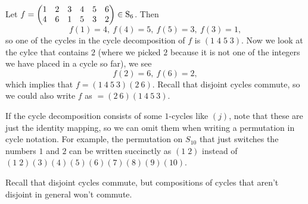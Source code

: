 \documentclass[11pt,dvipsnames]{book}
\numberwithin{figure}{section} %
\numberwithin{table}{section} %
\begin{document}
 \begin{example}  Let
$f=\left(\begin{matrix} %
1 & 2 & 3 & 4 & 5 & 6\cr%
4 & 6 & 1 & 5 & 3 & 2 \cr%
\end{matrix}\right)\in\mathrm{S}_{6}$.  Then
\[
f(1)=4,\  f(4)=5,\  f(5)=3,\  f(3)=1,
\]
so one of the cycles in the cycle decomposition of $f$ is $(1\; 4 \; 5 \; 3)$. Now we look at the cylce that contains $2$ (where we picked $2$ because it is not one of the integers we have placed in a cycle so far), we see
\[
f(2)=6,\  f(6)=2,
\]
 which implies that $f=(1\ 4\ 5\ 3)(2\ 6)$. Recall that disjoint cycles commute, so we could also write $f$ as $=(2\
6)(1\ 4\ 5\ 3)$.
\end{example}


If the cycle decomposition consists of some $1$-cycles like $(j)$, note that these are just the identity mapping, so we can omit them when writing a permutation in cycle notation. For example, the permutation on $S_{10}$ that just switches the numbers $1$ and $2$ can be written succinctly as $(1\; 2)$ instead of $(1 \; 2 ) (3)(4)(5)(6)(7)(8)(9)(10)$. 
%

Recall that disjoint cycles commute, but compositions of cycles that aren't disjoint in general won't commute. 
\end{document}
